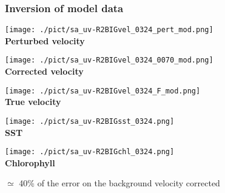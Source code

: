 \documentclass[compress,slidescentered,notes=hide]{beamer}
\begin{document}
\begin{frame}
  \frametitle{Inversion of model data}
\begin{minipage}{0.3\textwidth}
\begin{center}
\texttt{[image: ./pict/sa\_uv-R2BIGvel\_0324\_pert\_mod.png]}\\
{\small \bf Perturbed velocity}
\end{center}
\end{minipage}
\begin{minipage}{0.3\textwidth}
\begin{center}
\texttt{[image: ./pict/sa\_uv-R2BIGvel\_0324\_0070\_mod.png]}\\
{\small \bf Corrected velocity}
\end{center}
\end{minipage}
\begin{minipage}{0.3\textwidth}
\begin{center}
\texttt{[image: ./pict/sa\_uv-R2BIGvel\_0324\_F\_mod.png]}\\

{\small \bf True velocity}
\end{center}
\end{minipage}
\begin{minipage}{0.34\textwidth}
\begin{center}
\texttt{[image: ./pict/sa\_uv-R2BIGsst\_0324.png]}\\
{\small \bf SST}
\end{center}
\end{minipage}
\begin{minipage}{0.34\textwidth}
\begin{center}
\texttt{[image: ./pict/sa\_uv-R2BIGchl\_0324.png]}\\
{\small \bf Chlorophyll}
\end{center}
\end{minipage}
\begin{minipage}{0.3\textwidth}
\begin{block}{}
$\simeq$ 40\% of the error on the background velocity corrected
\end{block}
\end{minipage}

\end{frame}
\end{document}
